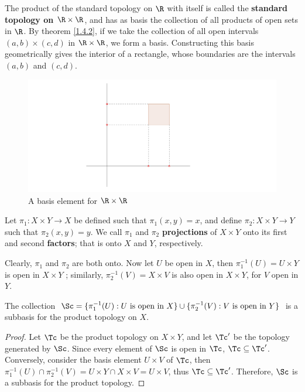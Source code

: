 \begin{example}
    The product of the standard topology on $\R$ with itself is called the \textbf{standard topology
    on $\R \times \R$}, and has as basis the collection of all products of open sets in $\R$.
    By theorem \ref{1.4.2}, if we take the collection of all open intervals $(a,b) \times (c,d)$ in
    $\R \times \R$, we form a basis. Constructing this basis geometrically gives the interior of
    a rectangle, whose boundaries are the intervals  $(a,b)$ and  $(c,d)$.

    \begin{figure}[h]
        \centering
        \includegraphics[scale = 0.5]{Figures/Chapter1/interiorOfRectangle.png}
        \caption{A basis element for $\R \times \R$}
        \label{fig1.4}
    \end{figure}
\end{example}

\begin{definition}
    Let $\pi_1:X \times Y \rightarrow X$ be defined such that  $\pi_1(x,y)=x$, and define $\pi_2:X \times Y \rightarrow Y$
    such that $\pi_2(x,y)=y$. We call $\pi_1$ and $\pi_2$ \textbf{projections} of $X \times Y$ onto
    its  first and second \textbf{factors}; that is onto $X$ and $Y$, respectively.
\end{definition}

Clearly, $\pi_1$ and $\pi_2$ are both onto. Now let $U$ be open in  $X$, then
$\pi_1^{-1}(U)=U \times Y$ is open in $X \times Y$ ; similarly, $\pi_2^{-1}(V)=X \times V$ is also open
in $X \times Y$, for  $V$ open in  $Y$.

\begin{theorem}\label{1.4.3}
    The collection $\Sc=\{\pi_1^{-1}(U): U \text{ is open in } X\} \cup \{\pi_2^{-1}(V): V \text{ is open in } Y\}$
    is a subbasis for the product topology on $X$.
\end{theorem}
\begin{proof}
    Let $\Tc$ be the product topology on  $X \times Y$, and let  $\Tc'$ be the topology
    generated by $\Sc$. Since every element of  $\Sc$ is open in  $\Tc$,  $\Tc \subseteq \Tc'$. Conversely,
    consider the basis element  $U \times V$ of $\Tc$, then  $\pi_1^{-1}(U) \cap \pi_2^{-1}(V)=
    U \times Y \cap X \times V=U \times V$, thus $\Tc \subseteq \Tc'$. Therefore, $\Sc$ is a subbasis for the
    product topology.
\end{proof}

